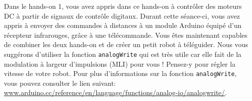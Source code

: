 Dans le hands-on 1, vous avez appris dans ce hands-on à contrôler des moteurs DC à partir de signaux de contrôle digitaux. Durant cette séance-ci, vous avez appris à envoyer des commandes à distances à un module Arduino équipé d'un récepteur infrarouges, grâce à une télécommande. Vous êtes maintenant capables de combiner les deux hands-on et de créer un petit robot à téléguider. Nous vous suggérons d'utiliser la fonction \texttt{analogWrite} qui est très utile car elle fait de la modulation à largeur d'impulsions (MLI) pour vous ! Pensez-y pour régler la vitesse de votre robot. Pour plus d'informations sur la fonction \texttt{analogWrite}, vous pouvez consulter le lien suivant: \url{www.arduino.cc/reference/en/language/functions/analog-io/analogwrite/}.
